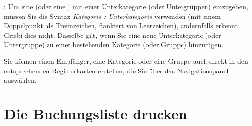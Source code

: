 \Note{}: Um eine  (oder eine ) mit einer Unterkategorie (oder Untergruppen) einzugeben, müssen Sie die Syntax \emph{Kategorie : Unterkategorie} verwenden (mit einem Doppelpunkt als Trennzeichen, flankiert von Leerzeichen), andernfalls erkennt Grisbi dies nicht. Dasselbe gilt, wenn Sie eine neue Unterkategorie (oder Untergruppe) zu einer bestehenden Kategorie (oder Gruppe) hinzufügen.

Sie können einen Empfänger, eine Kategorie oder eine Gruppe auch direkt in den entsprechenden Registerkarten erstellen, die Sie über das Navigationspanel auswählen.


\section{Die Buchungsliste drucken\label{transactions-print}}

